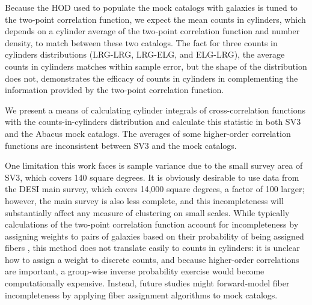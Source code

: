 \documentclass[fleqn,usenatbib]{mnras}
\begin{document}
Because the HOD used to populate the mock catalogs with galaxies is tuned to the two-point correlation function, we expect the mean counts in cylinders, which depends on a cylinder average of the two-point correlation function and number density, to match between these two catalogs. The fact for three counts in cylinders distributions (LRG-LRG, LRG-ELG, and ELG-LRG), the average counts in cylinders matches within sample error, but the shape of the distribution does not, demonstrates the efficacy of counts in cylinders in complementing the information provided by the two-point correlation function.

We present a means of calculating cylinder integrals of cross-correlation functions with the counts-in-cylinders distribution and calculate this statistic in both SV3 and the Abacus mock catalogs. The averages of some higher-order correlation functions are inconsistent between SV3 and the mock catalogs.

One limitation this work faces is sample variance due to the small survey area of SV3, which covers 140 square degrees. It is obviously desirable to use data from the DESI main survey, which covers 14,000 square degrees, a factor of 100 larger; however, the main survey is also less complete, and this incompleteness will substantially affect any measure of clustering on small scales. While typically calculations of the two-point correlation function account for incompleteness by assigning weights to pairs of galaxies based on their probability of being assigned fibers \citep{bianchi_unbiased_2017}, this method does not translate easily to counts in cylinders: it is unclear how to assign a weight to discrete counts, and because higher-order correlations are important, a group-wise inverse probability exercise would become computationally expensive. Instead, future studies might forward-model fiber incompleteness by applying fiber assignment algorithms to mock catalogs.
\end{document}
